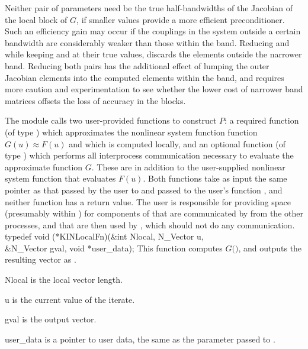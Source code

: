 Neither pair of parameters need be the true half-bandwidths of the Jacobian
of the local block of $G$, if smaller values provide a more efficient
preconditioner.  Such an efficiency gain may occur if the couplings
in the system outside a certain bandwidth are considerably weaker than
those within the band.  Reducing  and  while keeping
 and  at their true values, discards the elements
outside the narrower band.  Reducing both pairs has the additional
effect of lumping the outer Jacobian elements into the computed elements
within the band, and requires more caution and experimentation to see
whether the lower cost of narrower band matrices offsets the loss of
accuracy in the blocks.

The {\kinbbdpre} module calls two user-provided functions to construct $P$: 
a required function  (of type ) which
approximates the nonlinear system function function $G(u) \approx F(u)$ and which 
is computed locally, and an optional function  (of type ) 
which performs all interprocess communication necessary to evaluate 
the approximate function $G$.  
These are in addition to the user-supplied nonlinear system function that 
evaluates $F(u)$.
Both functions take as input the same pointer  as that passed
by the user to  and passed to the user's function ,
and neither function has a return value. The user is responsible for
providing space (presumably within ) for components of 
that are communicated by  from the other processes, and that are
then used by , which should not do any communication.
{
  typedef void (*KINLocalFn)(&int Nlocal, N\_Vector u, \\
                             &N\_Vector gval, void *user\_data);
}
{
  This  function computes $G($$)$, and outputs the resulting
  vector as .
}
{
  \begin{args}[Nlocal]
  \item[Nlocal] 
    is the local vector length.
  \item[u]
    is the current value of the iterate.
  \item[gval]
    is the output vector.
  \item[user\_data]
    is a pointer to user data, the same as the       
    parameter passed to .  
  \end{args}
}
